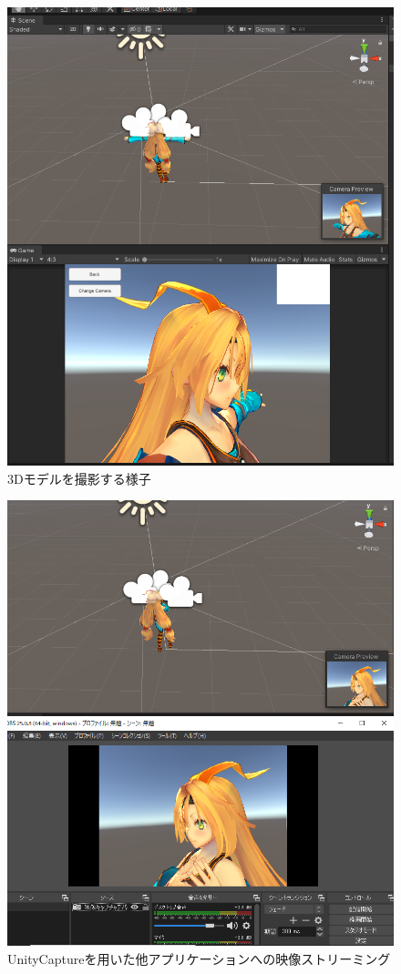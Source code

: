 \begin{figure}[tp]
  \centering
  \includegraphics[scale=0.7]{fig/unitycam.png}
  \caption{3Dモデルを撮影する様子}
\end{figure}

\begin{figure}[tp]
  \centering
  \includegraphics[scale=0.6]{fig/unitycapture.png}
  \caption{UnityCaptureを用いた他アプリケーションへの映像ストリーミング}
\end{figure}

